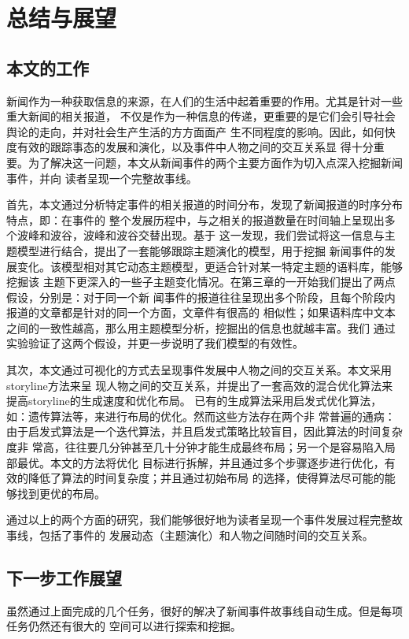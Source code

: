 \chapter{总结与展望}

\section{本文的工作}
新闻作为一种获取信息的来源，在人们的生活中起着重要的作用。尤其是针对一些重大新闻的相关报道，
不仅是作为一种信息的传递，更重要的是它们会引导社会舆论的走向，并对社会生产生活的方方面面产
生不同程度的影响。因此，如何快度有效的跟踪事态的发展和演化，以及事件中人物之间的交互关系显
得十分重要。为了解决这一问题，本文从新闻事件的两个主要方面作为切入点深入挖掘新闻事件，并向
读者呈现一个完整故事线。

首先，本文通过分析特定事件的相关报道的时间分布，发现了新闻报道的时序分布特点，即：在事件的
整个发展历程中，与之相关的报道数量在时间轴上呈现出多个波峰和波谷，波峰和波谷交替出现。基于
这一发现，我们尝试将这一信息与主题模型进行结合，提出了一套能够跟踪主题演化的模型，用于挖掘
新闻事件的发展变化。该模型相对其它动态主题模型，更适合针对某一特定主题的语料库，能够挖掘该
主题下更深入的一些子主题变化情况。在第三章的一开始我们提出了两点假设，分别是：对于同一个新
闻事件的报道往往呈现出多个阶段，且每个阶段内报道的文章都是针对的同一个方面，文章件有很高的
相似性；如果语料库中文本之间的一致性越高，那么用主题模型分析，挖掘出的信息也就越丰富。我们
通过实验验证了这两个假设，并更一步说明了我们模型的有效性。

其次，本文通过可视化的方式去呈现事件发展中人物之间的交互关系。本文采用storyline方法来呈
现人物之间的交互关系，并提出了一套高效的混合优化算法来提高storyline的生成速度和优化布局。
已有的生成算法采用启发式优化算法，如：遗传算法等，来进行布局的优化。然而这些方法存在两个非
常普遍的通病：由于启发式算法是一个迭代算法，并且启发式策略比较盲目，因此算法的时间复杂度非
常高，往往要几分钟甚至几十分钟才能生成最终布局；另一个是容易陷入局部最优。本文的方法将优化
目标进行拆解，并且通过多个步骤逐步进行优化，有效的降低了算法的时间复杂度；并且通过初始布局
的选择，使得算法尽可能的能够找到更优的布局。

通过以上的两个方面的研究，我们能够很好地为读者呈现一个事件发展过程完整故事线，包括了事件的
发展动态（主题演化）和人物之间随时间的交互关系。
\section{下一步工作展望}
虽然通过上面完成的几个任务，很好的解决了新闻事件故事线自动生成。但是每项任务仍然还有很大的
空间可以进行探索和挖掘。

